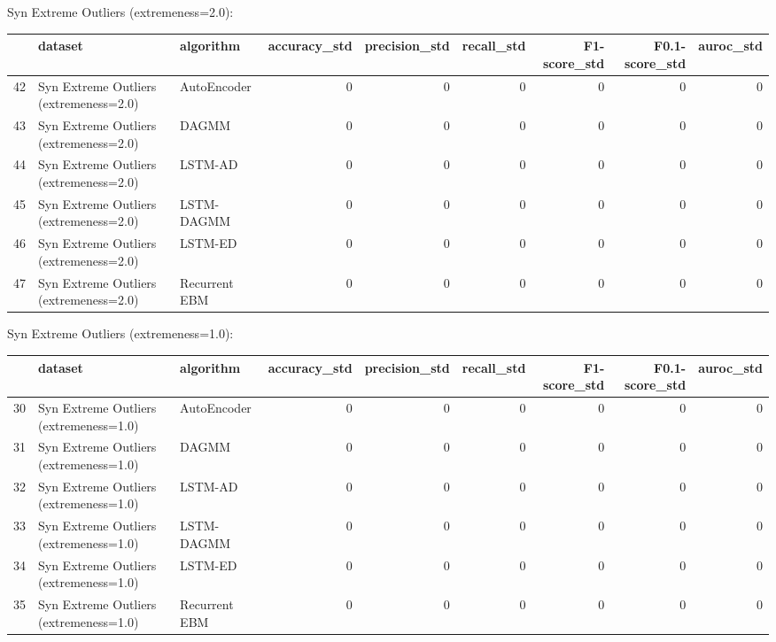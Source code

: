 Syn Extreme Outliers (extremeness=2.0):

\begin{tabular}{rllrrrrrr}
\hline
    & dataset                                & algorithm     &   accuracy\_std &   precision\_std &   recall\_std &   F1-score\_std &   F0.1-score\_std &   auroc\_std \\
\hline
 42 & Syn Extreme Outliers (extremeness=2.0) & AutoEncoder   &              0 &               0 &            0 &              0 &                0 &           0 \\
 43 & Syn Extreme Outliers (extremeness=2.0) & DAGMM         &              0 &               0 &            0 &              0 &                0 &           0 \\
 44 & Syn Extreme Outliers (extremeness=2.0) & LSTM-AD       &              0 &               0 &            0 &              0 &                0 &           0 \\
 45 & Syn Extreme Outliers (extremeness=2.0) & LSTM-DAGMM    &              0 &               0 &            0 &              0 &                0 &           0 \\
 46 & Syn Extreme Outliers (extremeness=2.0) & LSTM-ED       &              0 &               0 &            0 &              0 &                0 &           0 \\
 47 & Syn Extreme Outliers (extremeness=2.0) & Recurrent EBM &              0 &               0 &            0 &              0 &                0 &           0 \\
\hline
\end{tabular}

Syn Extreme Outliers (extremeness=1.0):

\begin{tabular}{rllrrrrrr}
\hline
    & dataset                                & algorithm     &   accuracy\_std &   precision\_std &   recall\_std &   F1-score\_std &   F0.1-score\_std &   auroc\_std \\
\hline
 30 & Syn Extreme Outliers (extremeness=1.0) & AutoEncoder   &              0 &               0 &            0 &              0 &                0 &           0 \\
 31 & Syn Extreme Outliers (extremeness=1.0) & DAGMM         &              0 &               0 &            0 &              0 &                0 &           0 \\
 32 & Syn Extreme Outliers (extremeness=1.0) & LSTM-AD       &              0 &               0 &            0 &              0 &                0 &           0 \\
 33 & Syn Extreme Outliers (extremeness=1.0) & LSTM-DAGMM    &              0 &               0 &            0 &              0 &                0 &           0 \\
 34 & Syn Extreme Outliers (extremeness=1.0) & LSTM-ED       &              0 &               0 &            0 &              0 &                0 &           0 \\
 35 & Syn Extreme Outliers (extremeness=1.0) & Recurrent EBM &              0 &               0 &            0 &              0 &                0 &           0 \\
\hline
\end{tabular}


